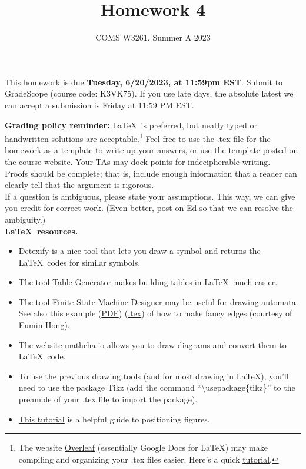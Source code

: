 \documentclass[letterpaper,11pt,twoside]{article}
\title{Homework 4}
\date{COMS W3261, Summer A 2023}
\theoremstyle{plain}
\theoremstyle{definition}
\theoremstyle{remark}
\theoremstyle{restate}
\begin{document}
\maketitle

This homework is due \textbf{Tuesday, 6/20/2023, at 11:59pm EST}. Submit to GradeScope (course code: K3VK75). If you use late days, the absolute latest we can accept a submission is Friday at 11:59 PM EST.

\textbf{Grading policy reminder:} \LaTeX~is preferred, but neatly typed or handwritten solutions are acceptable.\footnote{The website \href{https://www.overleaf.com/}{Overleaf} (essentially Google Docs for LaTeX) may make compiling and organizing your .tex files easier. Here's a quick \href{https://www.overleaf.com/learn/latex/Learn_LaTeX_in_30_minutes}{tutorial}.} Feel free to use the .tex file for the homework as a template to write up your answers, or use the template posted on the course website. Your TAs may dock points for indecipherable writing.\\

Proofs should be complete; that is, include enough information that a reader can clearly tell that the argument is rigorous. \\

If a question is ambiguous, please state your assumptions. This way, we can give you credit for correct work. (Even better, post on Ed so that we can resolve the ambiguity.) \\

\textbf{\LaTeX~resources.}
\begin{itemize}
    \item \href{https://detexify.kirelabs.org/classify.html}{Detexify} is a nice tool that lets you draw a symbol and returns the \LaTeX~codes for similar symbols. 
    \item The tool \href{https://www.tablesgenerator.com/}{Table Generator} makes building tables in \LaTeX~much easier.
    \item The tool \href{http://madebyevan.com/fsm/}{Finite State Machine Designer} may be useful for drawing automata. See also this example (\href{https://static.us.edusercontent.com/files/HZeTXimODzWeLvHIqsvjL2BG}{PDF}) (\href{https://static.us.edusercontent.com/files/RI3W8tQNvHMWFe9MkXV1KztA}{.tex}) of how to make fancy edges (courtesy of Eumin Hong).
    \item The website \href{https://www.mathcha.io/}{mathcha.io} allows you to draw diagrams and convert them to \LaTeX~code.
    \item To use the previous drawing tools (and for most drawing in \LaTeX), you'll need to use the package Tikz (add the command ``\textbackslash usepackage\{tikz\}'' to the preamble of your .tex file to import the package). 
    \item \href{https://www.overleaf.com/learn/latex/Positioning_of_Figures}{This tutorial} is a helpful guide to positioning figures.
\end{itemize}  
\end{document}
